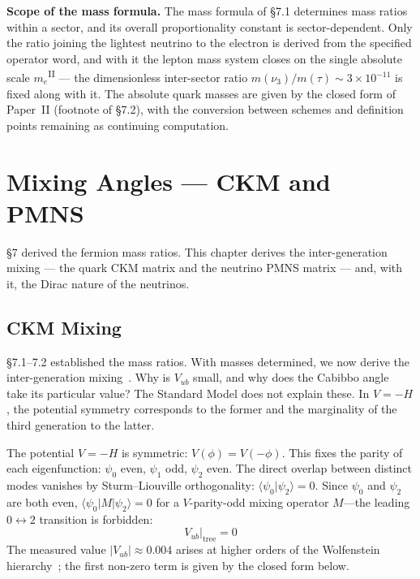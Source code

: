 \documentclass[12pt,a4paper]{article}
\newcommand{\PII}{\textsuperscript{\textup{II}}}
\begin{document}
\noindent\textbf{Scope of the mass formula.} The mass formula of \S7.1
determines mass ratios within a sector, and its overall proportionality
constant is sector-dependent. Only the ratio joining the lightest
neutrino to the electron is derived from the specified operator word,
and with it the lepton mass system closes on the single absolute
scale $m_e$\PII{} --- the dimensionless inter-sector ratio
$m(\nu_3)/m(\tau) \sim 3\times10^{-11}$ is fixed along with it. The absolute quark masses are given by the closed form of
Paper~II (footnote of \S7.2), with the conversion between schemes and definition points remaining as continuing computation.

\bigskip
\noindent

\section{Mixing Angles --- CKM and PMNS}\label{sec:mixing}

\S7 derived the fermion mass ratios. This chapter derives the inter-generation mixing --- the quark CKM matrix and the neutrino PMNS matrix --- and, with it, the Dirac nature of the neutrinos.

\subsection{CKM Mixing}\label{sec:ckm}

\S7.1--7.2 established the mass ratios. With masses determined,
we now derive the inter-generation mixing~\cite{km}.
Why is $V_{ub}$ small, and why does the Cabibbo angle~\cite{cabibbo}
take its particular value?
The Standard Model does not explain these.
In $V = -H$, the potential symmetry corresponds to the former
and the marginality of the third generation to the latter.

The potential $V = -H$ is symmetric: $V(\phi) = V(-\phi)$.
This fixes the parity of each eigenfunction: $\psi_0$ even, $\psi_1$ odd, $\psi_2$ even. The direct overlap between distinct modes vanishes by Sturm--Liouville orthogonality: $\langle\psi_0|\psi_2\rangle = 0$. Since $\psi_0$ and $\psi_2$ are both even, $\langle\psi_0|M|\psi_2\rangle = 0$ for a $V$-parity-odd mixing operator $M$---the leading $0\leftrightarrow 2$ transition is forbidden:
\begin{equation}
  V_{ub}\big|_\mathrm{tree} = 0
\end{equation}
The measured value $|V_{ub}| \approx 0.004$ arises at higher orders of the Wolfenstein hierarchy~\cite{wolfenstein}; the first non-zero term is given by the closed form below.
\end{document}
